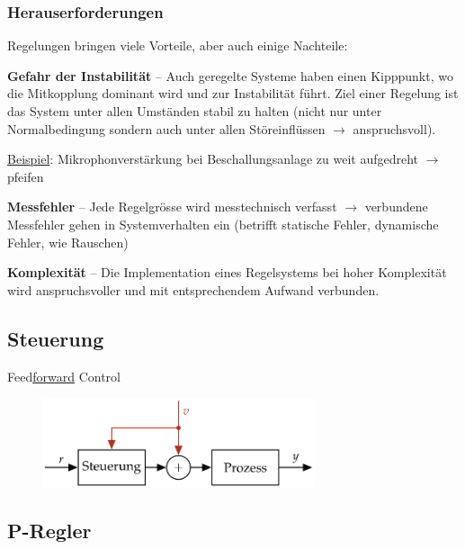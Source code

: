 \documentclass[
  10pt,
  a4paper,
  twocolumn]{article}
\numberwithin{equation}{section}
\begin{document}
\hypertarget{herauserforderungen}{%
\subsubsection{Herauserforderungen}\label{herauserforderungen}}

Regelungen bringen viele Vorteile, aber auch einige Nachteile:

\textbf{Gefahr der Instabilität} -- Auch geregelte Systeme haben einen
Kipppunkt, wo die Mitkopplung dominant wird und zur Instabilität führt.
Ziel einer Regelung ist das System unter allen Umständen stabil zu
halten (nicht nur unter Normalbedingung sondern auch unter allen
Störeinflüssen \(\rightarrow\) anspruchsvoll).

\ul{Beispiel}: Mikrophonverstärkung bei Beschallungsanlage zu weit
aufgedreht \(\rightarrow\) pfeifen

\textbf{Messfehler} -- Jede Regelgrösse wird messtechnisch verfasst
\(\rightarrow\) verbundene Messfehler gehen in Systemverhalten ein
(betrifft statische Fehler, dynamische Fehler, wie Rauschen)

\textbf{Komplexität} -- Die Implementation eines Regelsystems bei hoher
Komplexität wird anspruchsvoller und mit entsprechendem Aufwand
verbunden.

\hypertarget{steuerung}{%
\subsection{Steuerung}\label{steuerung}}

Feed\ul{forward} Control

\begin{figure}[H]

{\centering \includegraphics[width=8cm,height=\textheight]{images/basics/control.png}

}

\end{figure}

\hypertarget{p-regler}{%
\subsection{P-Regler}\label{p-regler}}
\end{document}
